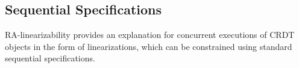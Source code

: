 %
%
%
%
%
%

\subsection{Sequential Specifications}
\label{subsec:sequential specification}

RA-linearizability provides an explanation for concurrent executions of CRDT objects in the form of linearizations, which can be constrained using standard sequential specifications.

